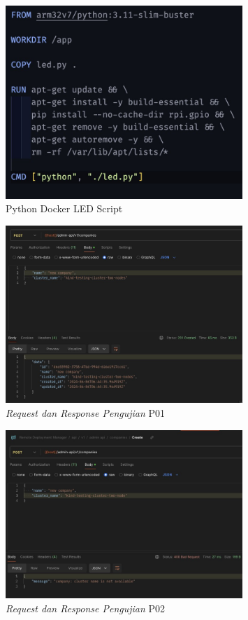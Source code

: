 \begin{figure}[ht]
  \centering
  \includegraphics[width=0.8\textwidth]{resources/chapter-4/pengujian/pengujian-sistem-raspi-09-dockerfile.jpg}
  \caption{Python Docker LED Script}
  \label{fig:raspi-docker-led-script}
\end{figure}

\begin{figure}[ht]
  \centering
  \includegraphics[width=0.8\textwidth]{resources/chapter-4/pengujian/p01.jpg}
  \caption{\textit{Request dan Response Pengujian} P01}
  \label{fig:pengujian-p01}
\end{figure}

\begin{figure}[ht]
  \centering
  \includegraphics[width=0.8\textwidth]{resources/chapter-4/pengujian/p02.jpg}
  \caption{\textit{Request dan Response Pengujian} P02}
  \label{fig:pengujian-p02}
\end{figure}

